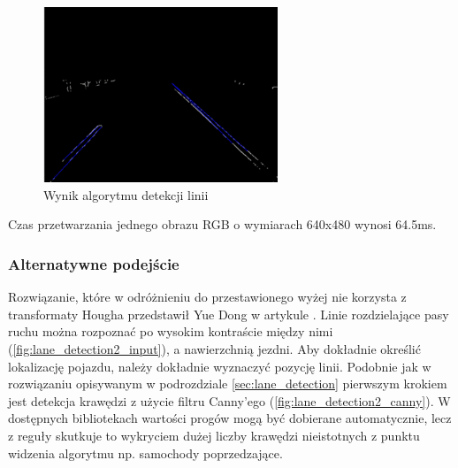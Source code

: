 \begin{figure}
  \centering
  \includegraphics[width=7cm]{img/prehough.png}
  \caption{Wynik algorytmu detekcji linii\cite{T3}}
  \label{fig:result}
\end{figure}

Czas przetwarzania jednego obrazu RGB o wymiarach 640x480 wynosi 64.5ms.

\subsubsection{Alternatywne podejście}
Rozwiązanie, które w odróżnieniu do przestawionego wyżej nie korzysta z transformaty Hougha przedstawił Yue Dong w artykule \cite{T6}.
Linie rozdzielające pasy ruchu można rozpoznać po wysokim kontraście między nimi (\ref{fig:lane_detection2_input}), a nawierzchnią jezdni. Aby dokładnie określić lokalizację pojazdu, należy dokładnie wyznaczyć pozycję linii. 
Podobnie jak w rozwiązaniu opisywanym w podrozdziale \ref{sec:lane_detection} pierwszym krokiem jest detekcja krawędzi z użycie filtru Canny'ego (\ref{fig:lane_detection2_canny}). W dostępnych bibliotekach wartości progów mogą być dobierane automatycznie, lecz z reguły skutkuje to wykryciem dużej liczby krawędzi nieistotnych z punktu widzenia algorytmu np. samochody poprzedzające.

